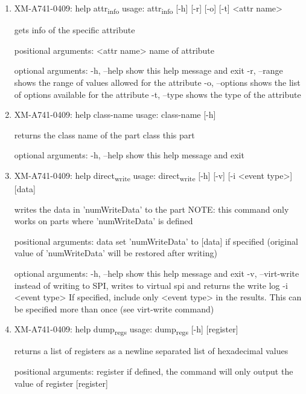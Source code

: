 \documentclass[11pt]{article}
\begin{document}
\begin{enumerate}
\item XM-A741-0409: help attr\textsubscript{info}
\label{sec:org93569c0}
usage: attr\textsubscript{info} [-h] [-r] [-o] [-t] <attr name>

gets info of the specific attribute

positional arguments:
  <attr name>    name of attribute

optional arguments:
  -h, --help     show this help message and exit
  -r, --range    shows the range of values allowed for the attribute
  -o, --options  shows the list of options available for the attribute
  -t, --type     shows the type of the attribute

\item XM-A741-0409: help class-name
\label{sec:org372fd63}
usage: class-name [-h]

returns the class name of the part class this part

optional arguments:
  -h, --help  show this help message and exit

\item XM-A741-0409: help direct\textsubscript{write}
\label{sec:org3f71455}
usage: direct\textsubscript{write} [-h] [-v] [-i <event type>] [data]

writes the data in 'numWriteData' to the part NOTE: this command only works on
parts where 'numWriteData' is defined

positional arguments:
  data              set 'numWriteData' to [data] if specified (original value
                    of 'numWriteData' will be restored after writing)

optional arguments:
  -h, --help        show this help message and exit
  -v, --virt-write  instead of writing to SPI, writes to virtual spi and
                    returns the write log
  -i <event type>   If specified, include only <event type> in the results.
                    This can be specified more than once (see virt-write
                    command)

\item XM-A741-0409: help dump\textsubscript{regs}
\label{sec:org1746f52}
usage: dump\textsubscript{regs} [-h] [register]

returns a list of registers as a newline separated list of hexadecimal values

positional arguments:
  register    if defined, the command will only output the value of register
              [register]


\end{enumerate}
\end{document}
